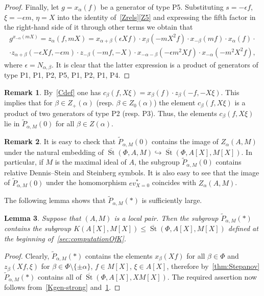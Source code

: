 \documentclass[oneside, 8pt]{amsart}
\newtheorem{lemma}{Lemma}
\theoremstyle{remark}
\theoremstyle{definition}
\numberwithin{lemma}{section}
\numberwithin{prop}{section}
\numberwithin{corollary}{section}
\numberwithin{externaltheorem}{section}
\newtheorem{rem}[lemma]{Remark}
\DeclareMathOperator{\St}{St}
\numberwithin{equation}{section}
\begin{document}
\begin{proof}
Finally, let $g = x_\alpha(f)$ be a generator of type P5. Substituting $s = -\epsilon f$, $\xi = -\epsilon m$, $\eta=X$ into the identity of~\cref{Zrels}\ref{Z5} and expressing the fifth factor in the right-hand side of it through other terms we obtain that
\begin{multline} \label{eq:zalpha} g^{x_{-\alpha}(mX)} = z_\alpha(f, mX) = x_{\alpha+\beta}(\epsilon Xf) \cdot x_{\beta}(-mX^2 f) \cdot x_{-\beta}(mf) \cdot x_\alpha(f) \cdot \\ 
 \cdot z_{\alpha+\beta}(-\epsilon X f, -\epsilon m) \cdot z_{-\beta}(-mf, -X) \cdot x_{-\alpha-\beta}(-\epsilon m^2X f) \cdot x_{-\alpha}(-m^2X^2 f), \end{multline}
where $\epsilon = N_{\alpha, \beta}$. It is clear that the latter expression is a product of generators of type P1, P1, P2, P5, P1, P2, P1, P4. \end{proof}

\begin{rem}\label{rem:c} By~\eqref{Cdef} one has $c_\beta(f, X\xi) = x_{\beta} (f) \cdot z_{\beta}(-f, -X\xi)$. This implies that for $\beta \in Z_+(\alpha)$ (resp. $\beta \in Z_0(\alpha)$) the element $c_\beta(f, X\xi)$ is a product of two generators of type P2 (resp. P3).
Thus, the elements $c_{\beta}(f, X\xi)$ lie in $\widetilde{P}_{\alpha, M}(0)$ for all $\beta \in Z(\alpha)$. \end{rem}
\begin{rem}\label{rem:DS}
It is easy to check that $\widetilde{P}_{\alpha, M}(0)$ contains the image of $Z_\alpha(A, M)$ under the natural embedding of $\overline{\St}(\Phi, A, M) \hookrightarrow \overline{\St}(\Phi, A[X], M[X])$.
In particular, if $M$ is the maximal ideal of $A$, the subgroup $\widetilde{P}_{\alpha, M}(0)$ contains relative Dennis--Stein and Steinberg symbols. It is also easy to see that the image of $\widetilde{P}_{\alpha, M}(0)$ under the homomorphism $ev_{X=0}^*$ coincides with $Z_\alpha(A, M)$. \end{rem}

The following lemma shows that $\widetilde{P}_{\alpha, M}(*)$ is sufficiently large.
\begin{lemma} \label{Pstar-large} Suppose that $(A, M)$ is a local pair. 
Then the subgroup $\widetilde{P}_{\alpha, M}(*)$ contains the subgroup $K(A[X], M[X]) \leq \overline{\St}(\Phi, A[X], M[X])$ defined at the beginning of~\cref{sec:computationOfK}. \end{lemma}
\begin{proof} Clearly, $\widetilde{P}_{\alpha, M}(*)$ contains the elements $x_\beta(Xf)$ for all $\beta \in \Phi$ and $z_\beta(Xf, \xi)$ for $\beta \in \Phi \setminus \{\pm \alpha\}$, $f \in M[X]$, $\xi\in A[X]$, therefore by~\cref{thm:Stepanov} $\widetilde{P}_{\alpha, M}(*)$ contains all of $\overline{\St}(\Phi, A[X], XM[X])$. The required assertion now follows from~\cref{Kgen-strong} and~\cref{rem:c}. \end{proof}
\end{document}
